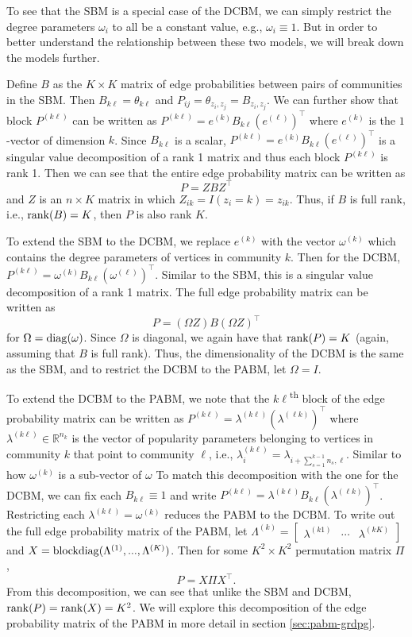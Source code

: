 \documentclass[
  12pt,
]{article}
\theoremstyle{definition}
\theoremstyle{definition}
\theoremstyle{definition}
\theoremstyle{definition}
\theoremstyle{remark}
\begin{document}
To see that the SBM is a special case of the DCBM, we can simply restrict the degree parameters \(\omega_i\) to all be a constant value, e.g., \(\omega_i \equiv 1\).
But in order to better understand the relationship between these two models, we will break down the models further.

Define \(B\) as the \(K \times K\) matrix of edge probabilities between pairs of communities in the SBM.
Then \(B_{k \ell} = \theta_{k \ell}\) and \(P_{ij} = \theta_{z_i, z_j} = B_{z_i, z_j}\).
We can further show that block \(P^{(k \ell)}\) can be written as \(P^{(k \ell)} = e^{(k)} B_{k \ell} (e^{(\ell)})^\top\) where \(e^{(k)}\) is the \(1\)-vector of dimension \(k\).
Since \(B_{k \ell}\) is a scalar, \(P^{(k \ell)} = e^{(k)} B_{k \ell} (e^{(\ell)})^\top\) is a singular value decomposition of a rank 1 matrix and thus each block \(P^{(k \ell)}\) is rank 1.
Then we can see that the entire edge probability matrix can be written as
\[P = Z B Z^\top\]
and \(Z\) is an \(n \times K\) matrix in which \(Z_{ik} = I(z_i = k) = z_{ik}\). Thus, if \(B\) is full rank, i.e., \(\mathrm{rank}(B) = K\), then \(P\) is also rank \(K\).

To extend the SBM to the DCBM, we replace \(e^{(k)}\) with the vector \(\omega^{(k)}\) which contains the degree parameters of vertices in community \(k\).
Then for the DCBM, \(P^{(k \ell)} = \omega^{(k)} B_{k \ell} (\omega^{(\ell)})^\top\).
Similar to the SBM, this is a singular value decomposition of a rank 1 matrix.
The full edge probability matrix can be written as
\[P = (\Omega Z) B (\Omega Z)^\top\]
for \(\Omega = \mathrm{diag}(\omega)\).
Since \(\Omega\) is diagonal, we again have that \(\mathrm{rank}(P) = K\) (again, assuming that \(B\) is full rank).
Thus, the dimensionality of the DCBM is the same as the SBM, and to restrict the DCBM to the PABM, let \(\Omega = I\).

To extend the DCBM to the PABM, we note that the \(k \ell\)\textsuperscript{th} block of the edge probability matrix can be written as \(P^{(k \ell)} = \lambda^{(k \ell)} (\lambda^{(\ell k)})^\top\) where \(\lambda^{(k \ell)} \in \mathbb{R}^{n_k}\) is the vector of popularity parameters belonging to vertices in community \(k\) that point to community \(\ell\), i.e., \(\lambda^{(k \ell)}_i = \lambda_{i + \sum_{s=1}^{k-1} n_s, \ell}\).
Similar to how \(\omega^{(k)}\) is a sub-vector of \(\omega\)
To match this decomposition with the one for the DCBM, we can fix each \(B_{k \ell} \equiv 1\) and write \(P^{(k \ell)} = \lambda^{(k \ell)} B_{k \ell} (\lambda^{(\ell k)})^\top\).
Restricting each \(\lambda^{(k \ell)} = \omega^{(k)}\) reduces the PABM to the DCBM.
To write out the full edge probability matrix of the PABM, let \(\Lambda^{(k)} =\begin{bmatrix} \lambda^{(k1)} & \cdots & \lambda^{(kK)} \end{bmatrix}\) and \(X = \mathrm{blockdiag}(\Lambda^{(1)}, ..., \Lambda^{(K)})\).
Then for some \(K^2 \times K^2\) permutation matrix \(\Pi\),
\[P = X \Pi X^\top.\]
From this decomposition, we can see that unlike the SBM and DCBM, \(\mathrm{rank}(P) = \mathrm{rank}(X) = K^2\).
We will explore this decomposition of the edge probability matrix of the PABM in more detail in section \ref{sec:pabm-grdpg}.
\end{document}
